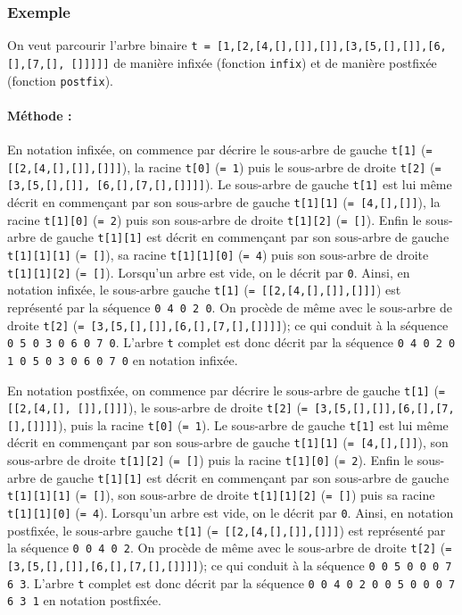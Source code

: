 \subsubsection{Exemple}
On veut parcourir l'arbre binaire \texttt{t = [1,[2,[4,[],[]],[]],[3,[5,[],[]],[6,[],[7,[], []]]]]} de manière infixée (fonction \texttt{infix}) et de manière postfixée (fonction \texttt{postfix}).

\paragraph{Méthode :} En notation infixée, on commence par décrire le sous-arbre de gauche
\texttt{t[1]} (\texttt{= [[2,[4,[],[]],[]]]}), la racine \texttt{t[0]} (\texttt{= 1})
puis le sous-arbre de droite
\texttt{t[2]} (\texttt{= [3,[5,[],[]], [6,[],[7,[],[]]]]}). 
Le sous-arbre de gauche \texttt{t[1]} est lui même décrit
en commençant par son sous-arbre de gauche \texttt{t[1][1]} (\texttt{= [4,[],[]]}), 
la racine \texttt{t[1][0]} (\texttt{= 2}) puis son sous-arbre de droite \texttt{t[1][2]} 
(\texttt{= []}). Enfin le sous-arbre de gauche \texttt{t[1][1]} est décrit en commençant
par son sous-arbre de gauche \texttt{t[1][1][1]} (\texttt{= []}), sa racine \texttt{t[1][1][0]}
(\texttt{= 4}) puis son sous-arbre de droite \texttt{t[1][1][2]} (\texttt{= []}).
Lorsqu'un arbre est vide, on le décrit par \texttt{0}.
Ainsi, en notation infixée, le sous-arbre gauche \texttt{t[1]} 
(\texttt{= [[2,[4,[],[]],[]]]}) est représenté par
la séquence \texttt{0 4 0 2 0}. On procède de même avec le sous-arbre de droite
\texttt{t[2]} (\texttt{= [3,[5,[],[]],[6,[],[7,[],[]]]]}); ce qui conduit à la séquence
\texttt{0 5 0 3 0 6 0 7 0}. L'arbre \texttt{t} complet est donc décrit par la séquence
\texttt{0 4 0 2 0 1 0 5 0 3 0 6 0 7 0} en notation infixée.

En notation postfixée, on commence par décrire le sous-arbre de gauche 
\texttt{t[1]} (\texttt{= [[2,[4,[], []],[]]]}), le sous-arbre de droite
\texttt{t[2]} (\texttt{= [3,[5,[],[]],[6,[],[7,[],[]]]]}), puis la racine \texttt{t[0]} (\texttt{= 1}). 
Le sous-arbre de gauche \texttt{t[1]} est lui même décrit
en commençant par son sous-arbre de gauche \texttt{t[1][1]} (\texttt{= [4,[],[]]}), 
son sous-arbre de droite \texttt{t[1][2]} (\texttt{= []}) puis la racine \texttt{t[1][0]} (\texttt{= 2}). Enfin le sous-arbre de gauche \texttt{t[1][1]} est décrit en commençant
par son sous-arbre de gauche \texttt{t[1][1][1]} (\texttt{= []}), son sous-arbre de droite \texttt{t[1][1][2]} (\texttt{= []}) puis sa racine \texttt{t[1][1][0]}
(\texttt{= 4}).
Lorsqu'un arbre est vide, on le décrit par \texttt{0}.
Ainsi, en notation postfixée, le sous-arbre gauche \texttt{t[1]} 
(\texttt{= [[2,[4,[],[]],[]]]}) est représenté par
la séquence \texttt{0 0 4 0 2}. On procède de même avec le sous-arbre de droite
\texttt{t[2]} (\texttt{= [3,[5,[],[]],[6,[],[7,[],[]]]]}); ce qui conduit à la séquence
\texttt{0 0 5 0 0 0 7 6 3}. L'arbre \texttt{t} complet est donc décrit par la séquence
\texttt{0 0 4 0 2 0 0 5 0 0 0 7 6 3 1} en notation postfixée.

